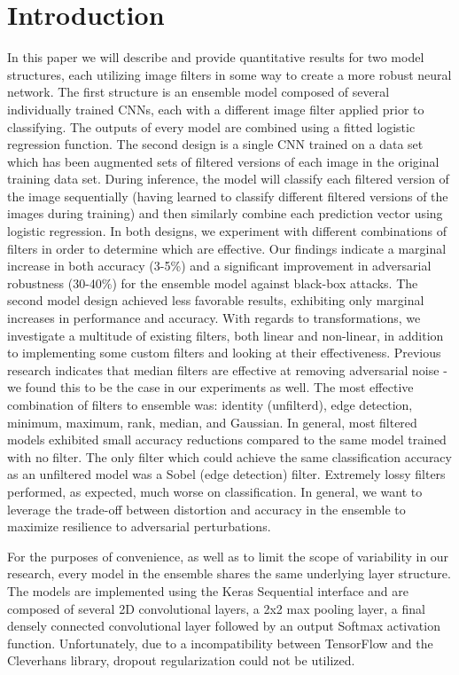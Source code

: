\section{Introduction} \label{s:introduction}
In this paper we will describe and provide quantitative results for two model structures, each utilizing image filters in some way to create a more robust neural network.
The first structure is an ensemble model composed of several individually trained CNNs, each with a different image filter applied prior to classifying.
The outputs of every model are combined using a fitted logistic regression function.
The second design is a single CNN trained on a data set which has been augmented sets of filtered versions of each image in the original training data set.
During inference, the model will classify each filtered version of the image sequentially (having learned to classify different filtered versions of the images during training) and then similarly combine each prediction vector using logistic regression.
In both designs, we experiment with different combinations of filters in order to determine which are effective.
Our findings indicate a marginal increase in both accuracy (3-5\%) and a significant improvement in adversarial robustness (30-40\%) for the ensemble model against black-box attacks.
The second model design achieved less favorable results, exhibiting only marginal increases in performance and accuracy.
With regards to transformations, we investigate a multitude of existing filters, both linear and non-linear, in addition to implementing some custom filters and looking at their effectiveness.
Previous research indicates that median filters are effective at removing adversarial noise \cite{osadchy2016} - we found this to be the case in our experiments as well.
The most effective combination of filters to ensemble was: identity (unfilterd), edge detection, minimum, maximum, rank, median, and Gaussian.
In general, most filtered models exhibited small accuracy reductions compared to the same model trained with no filter.
The only filter which could achieve the same classification accuracy as an unfiltered model was a Sobel (edge detection) filter.
Extremely lossy filters performed, as expected, much worse on classification.
In general, we want to leverage the trade-off between distortion and accuracy in the ensemble to maximize resilience to adversarial perturbations.

For the purposes of convenience, as well as to limit the scope of variability in our research, every model in the ensemble shares the same underlying layer structure.
The models are implemented using the Keras Sequential interface and are composed of several 2D convolutional layers, a 2x2 max pooling layer, a final densely connected convolutional layer followed by an output Softmax activation function.
Unfortunately, due to a incompatibility between TensorFlow and the Cleverhans library, dropout regularization could not be utilized.

